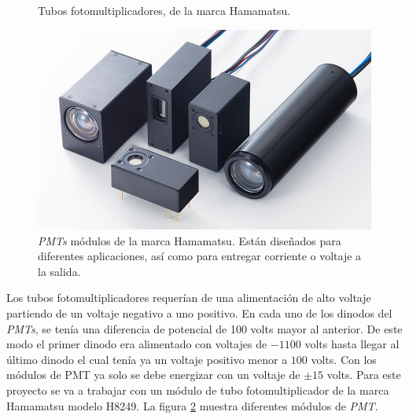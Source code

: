 \begin{figure}[h!]
	\centering
	\caption[Tubos fotomultiplicadores]{Tubos fotomultiplicadores, de la marca Hamamatsu. \cite{Hamamatsu2007}}
	\label{fig:PMT}
\end{figure}

\begin{figure}
	\centering
	\includegraphics[width=0.7\linewidth]{Imagenes/2/PMTmodule}
	\caption{\textit{PMTs} módulos de la marca Hamamatsu. Están diseñados para diferentes aplicaciones, así como para entregar corriente o voltaje a la salida. \cite{Hamamatsu2007}}
	\label{fig:pmtModule}
\end{figure}

Los tubos fotomultiplicadores requerían de una alimentación de alto voltaje partiendo de un voltaje negativo a uno positivo. En cada uno de los dinodos del \textit{PMTs}, se tenía una diferencia de potencial de 100 volts mayor al anterior. De este modo el primer dinodo era alimentado con voltajes de $-1100$ volts hasta llegar al último dinodo el cual tenía ya un voltaje positivo menor a $100$ volts.
Con los módulos de PMT ya solo se debe energizar con un voltaje de $\pm 15$ volts. Para este proyecto se va a trabajar con un módulo de tubo fotomultiplicador de la marca Hamamatsu modelo H8249. La figura \ref{fig:pmtModule} muestra diferentes módulos de \textit{PMT}.


